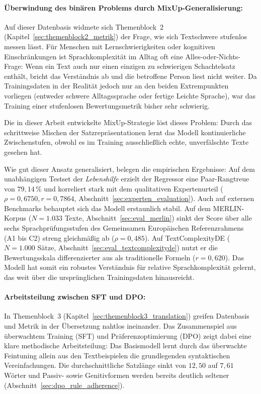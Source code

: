 \paragraph{Überwindung des binären Problems durch MixUp-Generalisierung:}
Auf dieser Datenbasis widmete sich Themenblock~2 (Kapitel~\ref{sec:themenblock2_metrik}) der Frage, wie sich Textschwere stufenlos messen lässt. Für Menschen mit Lernschwierigkeiten oder kognitiven Einschränkungen ist Sprachkomplexität im Alltag oft eine Alles-oder-Nichts-Frage: Wenn ein Text auch nur einen einzigen zu schwierigen Schachtelsatz enthält, bricht das Verständnis ab und die betroffene Person liest nicht weiter. Da Trainingsdaten in der Realität jedoch nur an den beiden Extrempunkten vorliegen (entweder schwere Alltagssprache oder fertige Leichte Sprache), war das Training einer stufenlosen Bewertungsmetrik bisher sehr schwierig.

Die in dieser Arbeit entwickelte MixUp-Strategie löst dieses Problem: Durch das schrittweise Mischen der Satzrepräsentationen lernt das Modell kontinuierliche Zwischenstufen, obwohl es im Training ausschließlich echte, unverfälschte Texte gesehen hat. 

Wie gut dieser Ansatz generalisiert, belegen die empirischen Ergebnisse: Auf dem unabhängigen Testset der \textit{Lebenshilfe} erzielt der Regressor eine Paar-Rangtreue von $79{,}14\,\%$ und korreliert stark mit dem qualitativen Expertenurteil ($\rho = 0{,}6750, r = 0{,}7864$, Abschnitt~\ref{sec:experten_evaluation}). Auch auf externen Benchmarks behauptet sich das Modell erstaunlich stabil. Auf dem MERLIN-Korpus ($N = 1.033$ Texte, Abschnitt~\ref{sec:eval_merlin}) sinkt der Score über alle sechs Sprachprüfungsstufen des Gemeinsamen Europäischen Referenzrahmens (A1 bis C2) streng gleichmäßig ab ($\rho = 0{,}485$). Auf TextComplexityDE ($N = 1.000$ Sätze, Abschnitt~\ref{sec:eval_textcomplexityde}) nutzt er die Bewertungsskala differenzierter aus als traditionelle Formeln ($r = 0{,}620$). Das Modell hat somit ein robustes Verständnis für relative Sprachkomplexität gelernt, das weit über die ursprünglichen Trainingsdaten hinausreicht.

\paragraph{Arbeitsteilung zwischen SFT und DPO:}
In Themenblock~3 (Kapitel~\ref{sec:themenblock3_translation}) greifen Datenbasis und Metrik in der Übersetzung nahtlos ineinander. Das Zusammenspiel aus überwachtem Training (SFT) und Präferenzoptimierung (DPO) zeigt dabei eine klare methodische Arbeitsteilung: Das Basismodell lernt durch das überwachte Feintuning allein aus den Textbeispielen die grundlegenden syntaktischen Vereinfachungen. Die durchschnittliche Satzlänge sinkt von $12{,}50$ auf $7{,}61$ Wörter und Passiv- sowie Genitivformen werden bereits deutlich seltener (Abschnitt~\ref{sec:dpo_rule_adherence}).

